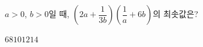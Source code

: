$a>0$, $b>0$일 때, $\left(2a+\dfrac{1}{3b}\right)\left(\dfrac{1}{a}+6b\right)$의 최솟값은?
\begin{choices32}{$6$}{$8$}{$10$}{$12$}{$14$}\end{choices32}
